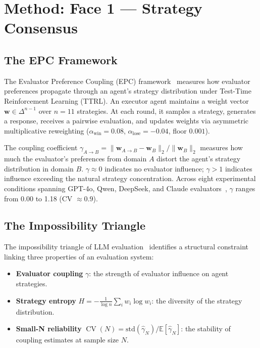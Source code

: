 \documentclass[11pt]{article}
\DeclareMathOperator{\CV}{CV}
\begin{document}
\section{Method: Face 1 --- Strategy Consensus}

\subsection{The EPC Framework}

The Evaluator Preference Coupling (EPC) framework~\cite{mmepc2026} measures how evaluator preferences propagate through an agent's strategy distribution under Test-Time Reinforcement Learning (TTRL). An executor agent maintains a weight vector $\mathbf{w} \in \Delta^{n-1}$ over $n = 11$ strategies. At each round, it samples a strategy, generates a response, receives a pairwise evaluation, and updates weights via asymmetric multiplicative reweighting ($\alpha_{\text{win}} = 0.08$, $\alpha_{\text{lose}} = -0.04$, floor $0.001$).

The coupling coefficient $\gamma_{A \to B} = \|\mathbf{w}_{A \to B} - \mathbf{w}_B\|_2 / \|\mathbf{w}_B\|_2$ measures how much the evaluator's preferences from domain $A$ distort the agent's strategy distribution in domain $B$. $\gamma \approx 0$ indicates no evaluator influence; $\gamma > 1$ indicates influence exceeding the natural strategy concentration. Across eight experimental conditions spanning GPT-4o, Qwen, DeepSeek, and Claude evaluators~\cite{mmepc2026}, $\gamma$ ranges from 0.00 to 1.18 (CV $\approx 0.9$).

\subsection{The Impossibility Triangle}

The impossibility triangle of LLM evaluation~\cite{impossible2026} identifies a structural constraint linking three properties of an evaluation system:
\begin{itemize}[leftmargin=*,nosep]
 \item \textbf{Evaluator coupling} $\gamma$: the strength of evaluator influence on agent strategies.
 \item \textbf{Strategy entropy} $H = -\frac{1}{\log n}\sum_i w_i \log w_i$: the diversity of the strategy distribution.
 \item \textbf{Small-N reliability} $\CV(N) = \text{std}(\hat{\gamma}_N) / \mathbb{E}[\hat{\gamma}_N]$: the stability of coupling estimates at sample size $N$.
\end{itemize}
\end{document}
